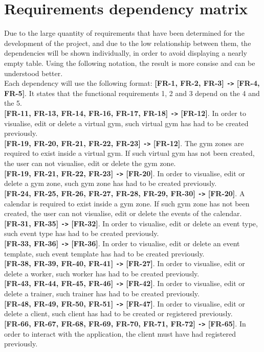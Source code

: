 \documentclass[a4paper, 12pt, oneside]{book}
\begin{document}
\section{Requirements dependency matrix}
Due to the large quantity of requirements that have been determined for the development of the project, and due to the low relationship between them, the dependencies will be shown individually, in order to avoid displaying a nearly empty table. Using the following notation, the result is more consise and can be understood better.
\\[8pt]
Each dependency will use the following format: \textbf{[FR-1, FR-2, FR-3] \texttt{->} [FR-4, FR-5]}. It states that the functional requirements 1, 2 and 3 depend on the 4 and the 5.
\\[8pt]
\textbf{[FR-11, FR-13, FR-14, FR-16, FR-17, FR-18] \texttt{->} [FR-12]}. In order to visualise, edit or delete a virtual gym, such virtual gym has had to be created previously.
\\[8pt]
\textbf{[FR-19, FR-20, FR-21, FR-22, FR-23] \texttt{->} [FR-12]}. The gym zones are required to exist inside a virtual gym. If such virtual gym has not been created, the user can not visualise, edit or delete the gym zone.
\\[8pt]
\textbf{[FR-19, FR-21, FR-22, FR-23] \texttt{->} [FR-20]}. In order to visualise, edit or delete a gym zone, such gym zone has had to be created previously.
\\[8pt]
\textbf{[FR-24, FR-25, FR-26, FR-27, FR-28, FR-29, FR-30] \texttt{->} [FR-20]}. A calendar is required to exist inside a gym zone. If such gym zone has not been created, the user can not visualise, edit or delete the events of the calendar.
\\[8pt]
\textbf{[FR-31, FR-35] \texttt{->} [FR-32]}. In order to visualise, edit or delete an event type, such event type has had to be created previously.
\\[8pt]
\textbf{[FR-33, FR-36] \texttt{->} [FR-36]}. In order to visualise, edit or delete an event template, such event template has had to be created previously.
\\[8pt]
\textbf{[FR-38, FR-39, FR-40, FR-41] \texttt{->} [FR-27]}. In order to visualise, edit or delete a worker, such worker has had to be created previously.
\\[8pt]
\textbf{[FR-43, FR-44, FR-45, FR-46] \texttt{->} [FR-42]}. In order to visualise, edit or delete a trainer, such trainer has had to be created previously.
\\[8pt]
\textbf{[FR-48, FR-49, FR-50, FR-51] \texttt{->} [FR-47]}. In order to visualise, edit or delete a client, such client has had to be created or registered previously.
\\[8pt]
\textbf{[FR-66, FR-67, FR-68, FR-69, FR-70, FR-71, FR-72] \texttt{->} [FR-65]}. In order to interact with the application, the client must have had registered previously.
\end{document}
